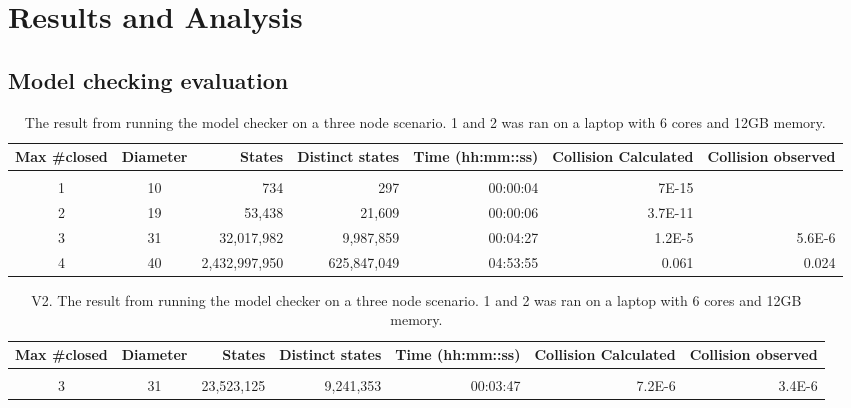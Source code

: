 \chapter{Results and Analysis}

\section{Model checking evaluation}




\begin{table}[h!]
    \label{table:no_malicious_builders}
    \begin{tabular}{c c r r r r r}
        Max \#closed & Diameter & States        & Distinct states & Time (hh:mm::ss) & Collision Calculated & Collision observed \\
        \hline                                                                                                                   \\
        1            & 10       & 734           & 297             & 00:00:04         & 7E-15                &                    \\
        2            & 19       & 53,438        & 21,609          & 00:00:06         & 3.7E-11              &                    \\
        3            & 31       & 32,017,982    & 9,987,859       & 00:04:27         & 1.2E-5               & 5.6E-6             \\
        4            & 40       & 2,432,997,950 & 625,847,049     & 04:53:55         & 0.061                & 0.024              \\
    \end{tabular}
    \caption[Three node model check]{The result from running the model checker on a three node scenario. 1 and 2 was ran on a laptop with 6 cores and 12GB memory.}
\end{table}

\begin{table}[h!]
    \label{table:one_malicious_builder}
    \begin{tabular}{c c r r r r r}
        Max \#closed & Diameter & States     & Distinct states & Time (hh:mm::ss) & Collision Calculated & Collision observed \\
        \hline                                                                                                                \\
        3            & 31       & 23,523,125 & 9,241,353       & 00:03:47         & 7.2E-6               & 3.4E-6             \\
    \end{tabular}
    \caption[Three node model check]{V2. The result from running the model checker on a three node scenario. 1 and 2 was ran on a laptop with 6 cores and 12GB memory.}
\end{table}

